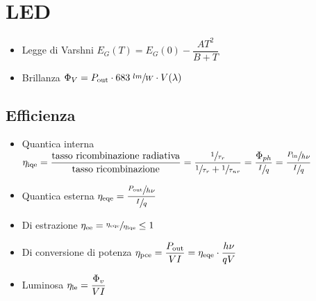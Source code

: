 \documentclass{article}
\begin{document}
\section{LED}
\begin{itemize}
  \item Legge di Varshni \( E_G (T) = E_G (0) - \dfrac{A T ^2}{B+T} \)
  \item Brillanza \( \Phi_V = P_{\textnormal{out}} \cdot 683 \; \sfrac{lm}{W} \cdot V (\lambda) \)
\end{itemize}

\subsection{Efficienza}
\begin{itemize}
  \item Quantica interna \( \eta_{\textnormal{iqe}} = \dfrac{\textnormal{tasso ricombinazione radiativa}}{\textnormal{tasso ricombinazione}} = \dfrac{\sfrac{1}{\tau_r}}{\sfrac{1}{\tau_r} + \sfrac{1}{\tau_{nr}}} = \dfrac{\Phi_{ph}}{\sfrac{I}{q}} = \dfrac{\sfrac{P_{\textnormal{in}}}{h \nu}}{\sfrac{I}{q}}\)
  \item Quantica esterna \( \eta_{\textnormal{eqe}} = \dfrac{\sfrac{P_{\textnormal{out}}}{h \nu}}{\sfrac{I}{q}}\)
  \item Di estrazione \( \eta_{\textnormal{ee}} = \sfrac{ \eta_{\textnormal{eqe}}}{\eta_{\textnormal{iqe}}} \leq 1 \)
  \item Di conversione di potenza \( \eta_{\textnormal{pce}} = \dfrac{P_{\textnormal{out}}}{V I} = \eta_{\textnormal{eqe}} \cdot \dfrac{h \nu}{q V}\)
  \item Luminosa \( \eta_{\textnormal{le}} = \dfrac{\Phi_v}{V I} \)
\end{itemize}
\end{document}
